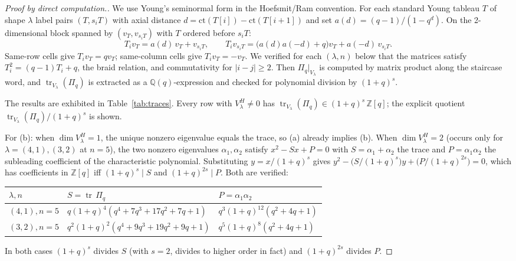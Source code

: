 \documentclass[11pt]{article}
\theoremstyle{definition}
\newcommand{\Pq}{\Pi_q}
\newcommand{\Z}{\mathbb{Z}}
\newcommand{\Q}{\mathbb{Q}}
\newcommand{\tr}{\operatorname{tr}}
\begin{document}
\begin{proof}[Proof by direct computation.]
We use Young's seminormal form in the Hoefsmit/Ram convention. For each
standard Young tableau $T$ of shape $\lambda$ label pairs $(T,s_iT)$ with
axial distance $d=\mathrm{ct}(T[i])-\mathrm{ct}(T[i+1])$ and set
$a(d)=(q-1)/(1-q^d)$. On the 2-dimensional block spanned by $(v_T,v_{s_iT})$
with $T$ ordered before $s_iT$:
\[
  T_i v_T = a(d)\,v_T + v_{s_iT},\qquad
  T_iv_{s_iT} = \bigl(a(d)a(-d)+q\bigr)v_T + a(-d)\,v_{s_iT}.
\]
Same-row cells give $T_iv_T=qv_T$; same-column cells give $T_iv_T=-v_T$.
We verified for each $(\lambda,n)$ below that the matrices satisfy
$T_i^2=(q-1)T_i+q$, the braid relation, and commutativity for
$|i-j|\ge 2$. Then $\Pq|_{V_\lambda}$ is computed by matrix product along
the staircase word, and $\tr_{V_\lambda}(\Pq)$ is extracted as a
$\Q(q)$-expression and checked for polynomial division by $(1+q)^s$.

The results are exhibited in Table~\ref{tab:traces}. Every row with
$V_\lambda^H\ne 0$ has $\tr_{V_\lambda}(\Pq)\in(1+q)^s\,\Z[q]$; the
explicit quotient $\tr_{V_\lambda}(\Pq)/(1+q)^s$ is shown.

For (b): when $\dim V_\lambda^H=1$, the unique nonzero eigenvalue equals
the trace, so (a) already implies (b). When $\dim V_\lambda^H=2$ (occurs
only for $\lambda=(4,1),(3,2)$ at $n=5$), the two nonzero eigenvalues
$\alpha_1,\alpha_2$ satisfy $x^2-Sx+P=0$ with $S=\alpha_1+\alpha_2$ the
trace and $P=\alpha_1\alpha_2$ the subleading coefficient of the
characteristic polynomial. Substituting $y=x/(1+q)^s$ gives
$y^2-\bigl(S/(1+q)^s\bigr)y+\bigl(P/(1+q)^{2s}\bigr)=0$, which has
coefficients in $\Z[q]$ iff $(1+q)^s\mid S$ and $(1+q)^{2s}\mid P$. Both
are verified:
\begin{center}\small
\begin{tabular}{lll}
\toprule
$\lambda,n$ & $S=\tr\,\Pq$ & $P=\alpha_1\alpha_2$\\
\midrule
$(4,1),n=5$ & $q(1+q)^4(q^4+7q^3+17q^2+7q+1)$ &
  $q^3(1+q)^{12}(q^2+4q+1)$\\
$(3,2),n=5$ & $q^2(1+q)^2(q^4+9q^3+19q^2+9q+1)$ &
  $q^5(1+q)^8(q^2+4q+1)$\\
\bottomrule
\end{tabular}
\end{center}
In both cases $(1+q)^s$ divides $S$ (with $s=2$, divides to higher order in
fact) and $(1+q)^{2s}$ divides $P$.
\end{proof}
\end{document}
